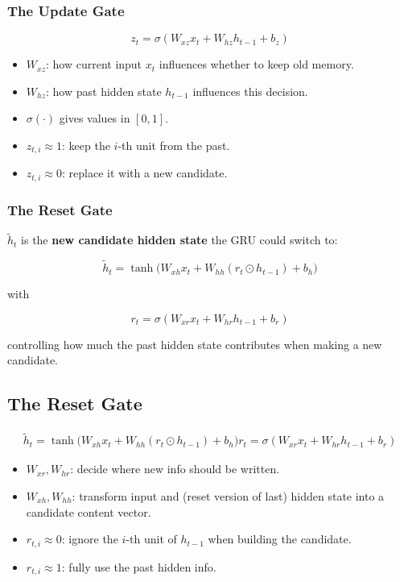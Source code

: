 \documentclass[
]{article}
\providecommand{\tightlist}{%
  \setlength{\itemsep}{0pt}\setlength{\parskip}{0pt}}
\begin{document}
\subsubsection{The Update Gate}\label{the-update-gate}

\[
z_t = \sigma(W_{xz}x_t + W_{hz}h_{t-1} + b_z)
\]

\begin{itemize}
\tightlist
\item
  \(W_{xz}\): how current input \(x_t\) influences whether to keep old
  memory.\\
\item
  \(W_{hz}\): how past hidden state \(h_{t-1}\) influences this
  decision.\\
\item
  \(\sigma(\cdot)\) gives values in \([0,1]\).\\
\item
  \(z_{t,i} \approx 1\): keep the \(i\)-th unit from the past.\\
\item
  \(z_{t,i} \approx 0\): replace it with a new candidate.
\end{itemize}

\subsubsection{The Reset Gate}\label{the-reset-gate}

\(\tilde{h}_t\) is the \textbf{new candidate hidden state} the GRU could
switch to:

\[
\tilde{h}_t = \tanh\!\big(W_{xh}x_t + W_{hh}(r_t \odot h_{t-1}) + b_h\big)
\]

with

\[r_t = \sigma(W_{xr}x_t + W_{hr}h_{t-1} + b_r)\]

controlling how much the past hidden state contributes when making a new
candidate.

\subsection{The Reset Gate}\label{the-reset-gate-1}

\[
\begin{aligned}
\tilde{h}_t = \tanh\!\big(W_{xh}x_t + W_{hh}(r_t \odot h_{t-1}) + b_h\big)
r_t = \sigma(W_{xr}x_t + W_{hr}h_{t-1} + b_r)
\end{aligned}
\]

\begin{itemize}
\tightlist
\item
  \(W_{xr}, W_{hr}\): decide where new info should be written.\\
\item
  \(W_{xh}, W_{hh}\): transform input and (reset version of last) hidden
  state into a candidate content vector.\\
\item
  \(r_{t,i} \approx 0\): ignore the \(i\)-th unit of \(h_{t-1}\) when
  building the candidate.\\
\item
  \(r_{t,i} \approx 1\): fully use the past hidden info.
\end{itemize}
\end{document}
